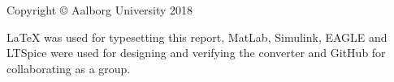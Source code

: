 \thispagestyle{empty}
{\small
\strut\vfill %
\noindent Copyright \copyright{} Aalborg University 2018\par
\vspace{0.2cm}
\noindent \LaTeX \: was used for typesetting this report,
MatLab, Simulink, EAGLE and LTSpice were used for designing and verifying the converter and
GitHub for collaborating as a group.
}
\clearpage